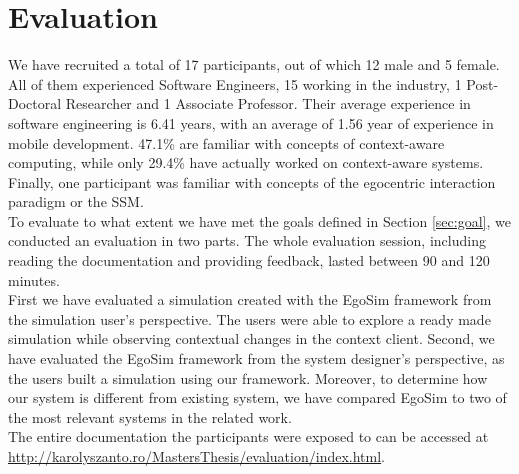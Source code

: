 \chapter{Evaluation}\label{ch:evaluation}
We have recruited a total of 17 participants, out of which 12 male and 5 female. All of them experienced Software Engineers, 15 working in the industry, 1 Post-Doctoral Researcher and 1 Associate Professor. Their average experience in software engineering is 6.41 years, with an average of 1.56 year of experience in mobile development. 47.1\% are familiar with concepts of context-aware computing, while only 29.4\% have actually worked on context-aware systems. Finally, one participant was familiar with concepts of the egocentric interaction paradigm or the SSM.\\

To evaluate to what extent we have met the goals defined in Section \ref{sec:goal}, we conducted an evaluation in two parts. The whole evaluation session, including reading the documentation and providing feedback, lasted between 90 and 120 minutes.\\

First we have evaluated a simulation created with the EgoSim framework from the simulation user's perspective. The users were able to explore a ready made simulation while observing contextual changes in the context client. Second, we have evaluated the EgoSim framework from the system designer's perspective, as the users built a simulation using our framework. Moreover, to determine how our system is different from existing system, we have compared EgoSim to two of the most relevant systems in the related work.\\

The entire documentation the participants were exposed to can be accessed at \url{http://karolyszanto.ro/MastersThesis/evaluation/index.html}.





